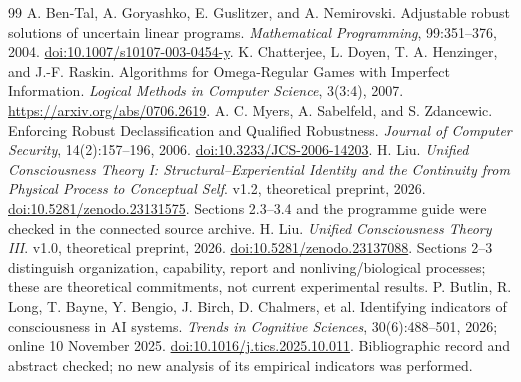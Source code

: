\begin{thebibliography}{99}
 A. Ben-Tal, A. Goryashko, E. Guslitzer, and A. Nemirovski. Adjustable robust solutions of uncertain linear programs. \emph{Mathematical Programming}, 99:351--376, 2004. \href{https://doi.org/10.1007/s10107-003-0454-y}{doi:10.1007/s10107-003-0454-y}.
 K. Chatterjee, L. Doyen, T. A. Henzinger, and J.-F. Raskin. Algorithms for Omega-Regular Games with Imperfect Information. \emph{Logical Methods in Computer Science}, 3(3:4), 2007. \url{https://arxiv.org/abs/0706.2619}.
 A. C. Myers, A. Sabelfeld, and S. Zdancewic. Enforcing Robust Declassification and Qualified Robustness. \emph{Journal of Computer Security}, 14(2):157--196, 2006. \href{https://doi.org/10.3233/JCS-2006-14203}{doi:10.3233/JCS-2006-14203}.
 H. Liu. \emph{Unified Consciousness Theory I: Structural--Experiential Identity and the Continuity from Physical Process to Conceptual Self}. v1.2, theoretical preprint, 2026. \href{https://doi.org/10.5281/zenodo.23131575}{doi:10.5281/zenodo.23131575}. Sections 2.3--3.4 and the programme guide were checked in the connected source archive.
 H. Liu. \emph{Unified Consciousness Theory III}. v1.0, theoretical preprint, 2026. \href{https://doi.org/10.5281/zenodo.23137088}{doi:10.5281/zenodo.23137088}. Sections 2--3 distinguish organization, capability, report and nonliving/biological processes; these are theoretical commitments, not current experimental results.
 P. Butlin, R. Long, T. Bayne, Y. Bengio, J. Birch, D. Chalmers, et al. Identifying indicators of consciousness in AI systems. \emph{Trends in Cognitive Sciences}, 30(6):488--501, 2026; online 10 November 2025. \href{https://doi.org/10.1016/j.tics.2025.10.011}{doi:10.1016/j.tics.2025.10.011}. Bibliographic record and abstract checked; no new analysis of its empirical indicators was performed.
\end{thebibliography}

